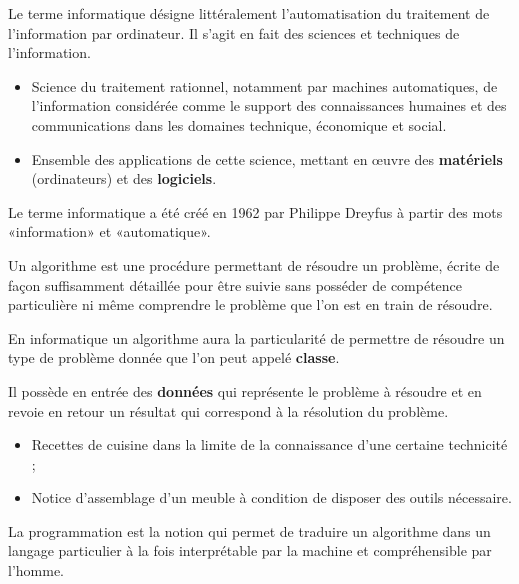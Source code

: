 \begin{defi}[Informatique]
Le terme informatique désigne littéralement l'automatisation du traitement de l'information par ordinateur. Il s'agit en fait des sciences et techniques de l'information. 
\begin{itemize}
\item Science du traitement rationnel, notamment par machines automatiques, de l'information considérée comme le support des connaissances humaines et des communications dans les domaines technique, économique et social.
\item Ensemble des applications de cette science, mettant en œuvre des \textbf{matériels} (ordinateurs) et des \textbf{logiciels}.
\end{itemize}
Le terme informatique a été créé en 1962 par Philippe Dreyfus à partir des mots «information» et «automatique».
\end{defi}

\begin{defi}[Algorithmique]
Un algorithme est une procédure permettant de résoudre un problème, écrite de façon suffisamment détaillée pour être suivie sans posséder de compétence particulière ni même comprendre le problème que l'on est en train de résoudre.

En informatique un algorithme aura la particularité de permettre de résoudre un type de problème donnée que l'on peut appelé \textbf{classe}.

Il possède en entrée des \textbf{données} qui représente le problème à résoudre et en revoie en retour un résultat qui correspond à la résolution du problème.


\end{defi}

\begin{exemple}

\begin{itemize}
\item Recettes de cuisine dans la limite de la connaissance d'une certaine technicité ;
\item Notice d'assemblage d'un meuble à condition de disposer des outils nécessaire.
\end{itemize}
\end{exemple}

\begin{defi}[Programmation]
La programmation est la notion qui permet de traduire un algorithme dans un langage particulier à la fois interprétable par la machine et compréhensible par l'homme.
\end{defi}






